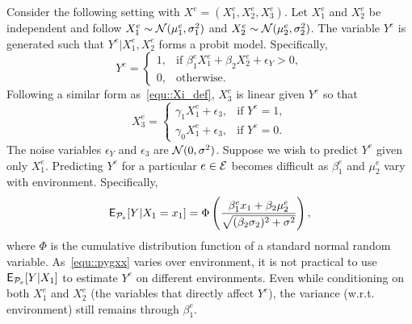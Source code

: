 \documentclass[conference,letterpaper]{IEEEtran}
\begin{document}
Consider the following setting with $X^e = (X^e_1,X^e_2,X^e_3)$.  Let $X^e_1$ and $X^e_2$ be independent and follow $X^e_1 \sim \mathcal{N}(\mu_{1}^e,\sigma^2_{1})$ and $X^e_2 \sim \mathcal{N}(\mu_{2}^e,\sigma^2_{2})$. The variable $Y^e$ is generated such that $Y^e|X^e_1,X^e_2$ forms a probit model. Specifically, 
\begin{equation*}
    Y^e  =\begin{cases}
	   1, & \text{if $\beta_1^eX^e_1 + \beta_2 X^e_2 + \epsilon_Y > 0 $},\\
       0, & \text{otherwise}.
	\end{cases}
\end{equation*}
Following a similar form as~\eqref{equ::Xi_def}, $X^e_3$ is linear given $Y^e$ so that
\begin{equation*}
    X^e_3 = \begin{cases}
	   \gamma_1X^e_1  + \epsilon_3, & \text{if $Y^e = 1$},\\
       \gamma_0X^e_1 + \epsilon_3, & \text{if $Y^e = 0$}.
	\end{cases}
\end{equation*}
The noise variables $\epsilon_Y$ and $\epsilon_3$ are \iid $\mathcal{N}(0, \sigma^2)$. Suppose we wish to predict $Y^e$ given only $X^e_1$. 
Predicting $Y^e$ for a particular $e\in\mathcal{E}$ becomes difficult as $\beta_1^e$ and $\mu^e_2$ vary with environment. Specifically, 
\begin{equation} \label{equ::pygxx}
    \E_{\Pc_e}[Y|X_1=x_1] = \Phi\left(\frac{\beta_1^ex_1 + \beta_2\mu^e_2}{\sqrt{(\beta_2\sigma_2)^2 + \sigma^2}} \right),
\end{equation}
where $\Phi$ is the cumulative distribution function of a standard normal random variable. As~\eqref{equ::pygxx} varies over environment, it is not practical to use $\operatorname{\sf E}_{\mathcal{P}_e}[Y|X_1]$ to estimate $Y^e$ on different environments. Even while conditioning on both $X^e_1$ and $X^e_2$ (the variables that directly affect $Y^e$), the variance (w.r.t. environment) still remains through $\beta_1^e$.
\end{document}
